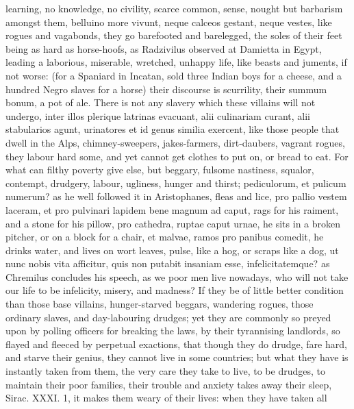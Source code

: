 {learning, no knowledge, no civility, scarce common, sense, nought but
barbarism amongst them, belluino more vivunt, neque calceos gestant,
neque vestes, like rogues and vagabonds, they go barefooted and
barelegged, the soles of their feet being as hard as horse-hoofs, as
Radzivilus observed at Damietta in Egypt, leading a laborious,
miserable, wretched, unhappy life, like beasts and juments, if
not worse: (for a Spaniard in Incatan, sold three Indian boys for
a cheese, and a hundred Negro slaves for a horse) their discourse is
scurrility, their summum bonum, a pot of ale. There is not any slavery
which these villains will not undergo, inter illos plerique latrinas
evacuant, alii culinariam curant, alii stabularios agunt, urinatores et
id genus similia exercent, \etc{} like those people that dwell in the
Alps, chimney-sweepers, jakes-farmers, dirt-daubers, vagrant
rogues, they labour hard some, and yet cannot get clothes to put on, or
bread to eat. For what can filthy poverty give else, but beggary,
fulsome nastiness, squalor, contempt, drudgery, labour, ugliness,
hunger and thirst; pediculorum, et pulicum numerum? as  he well
followed it in Aristophanes, fleas and lice, pro pallio vestem laceram,
et pro pulvinari lapidem bene magnum ad caput, rags for his raiment,
and a stone for his pillow, pro cathedra, ruptae caput urnae, he sits
in a broken pitcher, or on a block for a chair, et malvae, ramos pro
panibus comedit, he drinks water, and lives on wort leaves, pulse, like
a hog, or scraps like a dog, ut nunc nobis vita afficitur, quis non
putabit insaniam esse, infelicitatemque? as Chremilus concludes his
speech, as we poor men live nowadays, who will not take our life to be
 infelicity, misery, and madness?
If they be of little better condition than those base villains,
hunger-starved beggars, wandering rogues, those ordinary slaves, and
day-labouring drudges; yet they are commonly so preyed upon by 
polling officers for breaking the laws, by their tyrannising landlords,
so flayed and fleeced by perpetual exactions, that though they do
drudge, fare hard, and starve their genius, they cannot live in
some countries; but what they have is instantly taken from them,
the very care they take to live, to be drudges, to maintain their poor
families, their trouble and anxiety takes away their sleep, Sirac.
XXXI. 1, it makes them weary of their lives: when they have taken all
}
